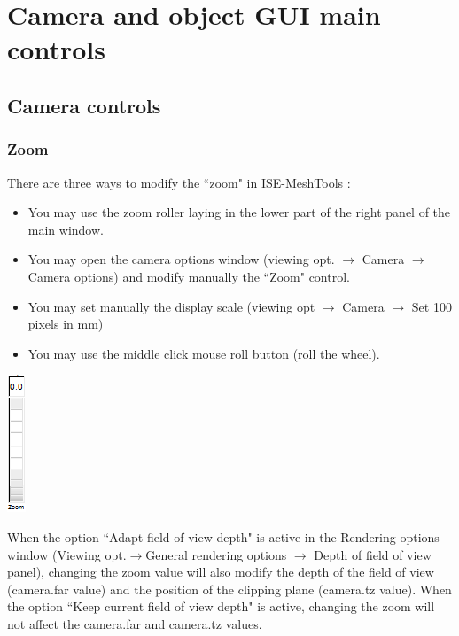 \chapter{Camera and object GUI main controls}
\minitoc  

 \section{Camera controls}
\subsection{Zoom}
There are three ways to modify the ``zoom" in ISE-MeshTools :


\begin{minipage}{0.7\textwidth}
\begin{itemize}
\item You may use the zoom roller laying in the lower part of the right panel of the main window.
\item	You may open the camera options window (viewing opt. $\rightarrow$  Camera $\rightarrow$ Camera options) and modify manually the ``Zoom" control.
\item	You may set manually the display scale (viewing opt $\rightarrow$ Camera $\rightarrow$ Set 100 pixels in mm)
\item	You may use the middle click mouse roll button (roll the wheel).
\end{itemize}
\end{minipage}    
\begin{minipage}{0.25\textwidth}\centering
  \includegraphics{images/Icons/zoom_01.png}
 \end{minipage}    


When the option ``Adapt field of view depth" is active in the Rendering options window (Viewing opt.$\rightarrow$General rendering options $\rightarrow$ Depth of field of view panel), changing the zoom value will also modify the depth of the field of view (camera.far value) and the position of the clipping plane (camera.tz value). When the option ``Keep current field of view depth" is active, changing the zoom will not affect the camera.far and camera.tz values.

